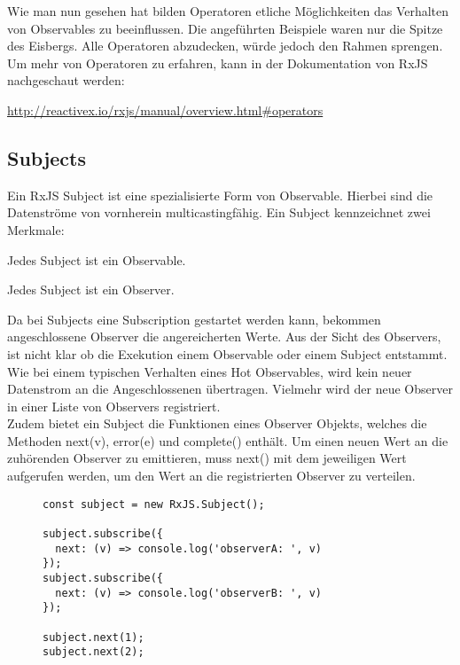 \noindent
Wie man nun gesehen hat bilden Operatoren etliche Möglichkeiten das Verhalten von Observables zu beeinflussen. Die angeführten Beispiele waren nur die Spitze des Eisbergs. Alle Operatoren abzudecken, würde jedoch den Rahmen sprengen. Um mehr von Operatoren zu erfahren, kann in der Dokumentation von RxJS nachgeschaut werden:

\begin{center}
\url{http://reactivex.io/rxjs/manual/overview.html#operators} 
\end{center}

\subsection{Subjects}

Ein RxJS Subject ist eine spezialisierte Form von Observable. Hierbei sind die Datenströme von vornherein multicastingfähig. Ein Subject kennzeichnet zwei Merkmale:

\begin{description}
\item Jedes Subject ist ein Observable.
\item Jedes Subject ist ein Observer.
\end{description}

\noindent
Da bei Subjects eine Subscription gestartet werden kann, bekommen angeschlossene Observer die angereicherten Werte. Aus der Sicht des Observers, ist nicht klar ob die Exekution einem Observable oder einem Subject entstammt. Wie bei einem typischen Verhalten eines Hot Observables, wird kein neuer Datenstrom an die Angeschlossenen übertragen. Vielmehr wird der neue Observer in einer Liste von Observers registriert.\\

\noindent
Zudem bietet ein Subject die Funktionen eines Observer Objekts, welches die Methoden next(v), error(e) und complete() enthält. Um einen neuen Wert an die zuhörenden Observer zu emittieren, muss next() mit dem jeweiligen Wert aufgerufen werden, um den Wert an die registrierten Observer zu verteilen.

\begin{figure}[H]
\begin{lstlisting}[basicstyle=\small]
const subject = new RxJS.Subject();

subject.subscribe({
  next: (v) => console.log('observerA: ', v)
});
subject.subscribe({
  next: (v) => console.log('observerB: ', v)
});

subject.next(1);
subject.next(2);
\end{lstlisting}
\end{figure}

